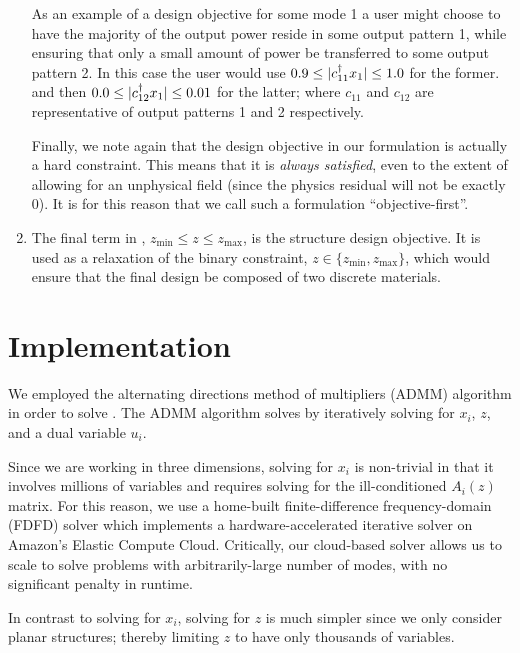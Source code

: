 \begin{enumerate}
    As an example of a design objective for some mode 1 
        a user might choose to have the majority of the output power
        reside in some output pattern 1,
        while ensuring that only a small amount of power 
        be transferred to some output pattern 2.
    In this case the user would use 
        $0.9 \le |c_{11}^\dagger x_1| \le 1.0$ for the former.
        and then $0.0 \le |c_{12}^\dagger x_1| \le 0.01$ for the latter;
        where $c_{11}$ and $c_{12}$ are representative of 
        output patterns 1 and 2 respectively.
        
    Finally, we note again that the design objective in our formulation
        is actually a hard constraint.
    This means that it is \emph{always satisfied}, 
        even to the extent of allowing for an unphysical field 
        (since the physics residual will not be exactly 0).
    It is for this reason that we call such a formulation ``objective-first''.

\item 
    The final term in , $z_\text{min} \le z \le z_\text{max}$,
        is the structure design objective.
    It is used as a relaxation of the binary constraint,
        $z \in \{z_\text{min}, z_\text{max}\}$,
        which would ensure that the final design be composed 
        of two discrete materials.
\end{enumerate}

\section{Implementation}
We employed the alternating directions method of multipliers (ADMM) algorithm 
    \cite{Boyd11}
    in order to solve .
The ADMM algorithm solves  by iteratively solving for 
    $x_i$, $z$, and a dual variable $u_i$.

Since we are working in three dimensions, solving  for $x_i$ 
    is non-trivial in that it involves millions of variables and
    requires solving for the ill-conditioned $A_i(z)$ matrix.
For this reason, we use a home-built
    finite-difference frequency-domain (FDFD) solver which 
    implements a hardware-accelerated iterative solver\cite{Shin12}
    on Amazon's Elastic Compute Cloud.
Critically, our cloud-based solver allows us to scale to solve problems
    with arbitrarily-large number of modes,
    with no significant penalty in runtime.

In contrast to solving for $x_i$, solving for $z$ is much simpler since we
    only consider planar structures;
    thereby limiting $z$ to have only thousands of variables.

